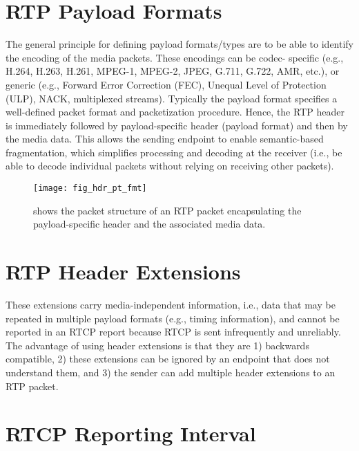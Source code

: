 \section{RTP Payload Formats}

The general principle for defining payload formats/types are to be able to
identify the encoding of the media packets. These encodings can be codec-
specific (e.g., H.264, H.263, H.261, MPEG-1, MPEG-2, JPEG, G.711, G.722, AMR,
etc.), or generic (e.g., Forward Error Correction (FEC), Unequal Level of
Protection (ULP), NACK, multiplexed streams). Typically the payload format
specifies a well-defined packet format and packetization procedure. Hence, the
RTP header is immediately followed by payload-specific header (payload format)
and then by the media data. This allows the sending endpoint to enable
semantic-based fragmentation, which simplifies processing and decoding at the
receiver (i.e., be able to decode individual packets without relying on
receiving other packets).

\begin{figure}
\centerline{\texttt{[image: fig\_hdr\_pt\_fmt]}}
\caption{shows the packet structure of an RTP packet encapsulating the
payload-specific header and the associated media data.}
\label{fig:3:pt.fmt}
\end{figure}

\section{RTP Header Extensions}

These extensions carry media-independent information, i.e., data that may be
repeated in multiple payload formats (e.g., timing information), and cannot be
reported in an RTCP report because RTCP is sent infrequently and unreliably.
The advantage of using header extensions is that they are 1) backwards
compatible, 2) these extensions can be ignored by an endpoint that does not
understand them, and 3) the sender can add multiple header extensions to an
RTP packet.

\section{RTCP Reporting Interval}


